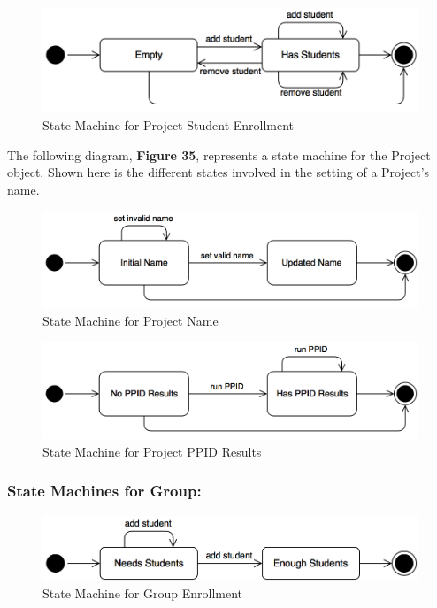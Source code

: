 \documentclass[12pt,letterpaper]{article}
\begin{document}
\begin{figure}[H]
	\centering{}
	\includegraphics[scale=0.3]{imgs/state/project-enrollment.png}
	\caption{State Machine for Project Student Enrollment}
\end{figure}

The following diagram, {\bf Figure 35}, represents a state machine for the Project object. Shown here is the different states involved in the setting of a Project's name.

\begin{figure}[H]
	\centering{}
	\includegraphics[scale=0.3]{imgs/state/project-name.png}
	\caption{State Machine for Project Name}
\end{figure}

\begin{figure}[H]
	\centering{}
	\includegraphics[scale=0.3]{imgs/state/project-ppid-results.png}
	\caption{State Machine for Project PPID Results}
\end{figure}

\subsubsection*{State Machines for Group:}

\begin{figure}[H]
	\centering{}
	\includegraphics[scale=0.3]{imgs/state/group-enrollment.png}
	\caption{State Machine for Group Enrollment}
\end{figure}
\end{document}
